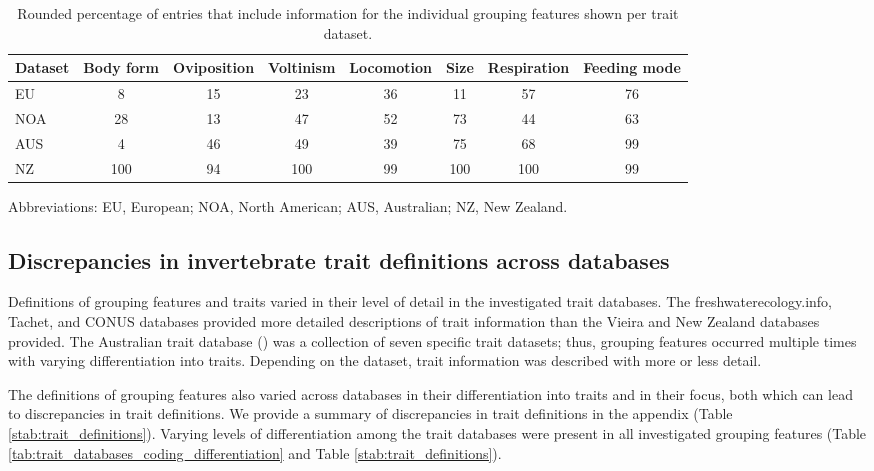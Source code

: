 \documentclass{article}
\begin{document}
\begin{table}[ht]
    \centering
    \caption{Rounded percentage of entries that include 
    information for the individual grouping features
    shown per trait dataset.} 
    \label{tab:trait_coverage}
    \begin{tabular}{lccccccc}
    \toprule[.1em]
    Dataset & Body form & Oviposition & Voltinism & Locomotion & Size & Respiration & Feeding mode \\ 
    \toprule[.1em]
    EU & 8 & 15 & 23 & 36 & 11 & 57 & 76 \\ 
    NOA & 28 & 13 & 47 & 52 & 73 & 44 & 63 \\ 
    AUS & 4 & 46 & 49 & 39 & 75 & 68 & 99 \\ 
    NZ & 100 & 94 & 100 & 99 & 100 & 100 & 99 \\ 
    \bottomrule
    \end{tabular}
\end{table}
\begin{minipage}{\linewidth}{\fontsize{8}{10}\selectfont
\centering
Abbreviations: EU, European; NOA, North American; AUS, Australian; NZ, New Zealand.
}
\end{minipage}

\newpage


\subsection*{Discrepancies in invertebrate trait definitions across databases}

Definitions of grouping features and traits varied in their level of detail in the investigated trait databases. The freshwaterecology.info, Tachet, and CONUS databases provided more detailed descriptions of trait information than the Vieira and New Zealand databases provided. The Australian trait database (\cite{kefford_integrated_2020}) was a collection of seven specific trait datasets; thus, grouping features occurred multiple times with varying differentiation into traits. Depending on the dataset, trait information was described with more or less detail.

The definitions of grouping features also varied across databases in their differentiation into traits and in their focus, both which can lead to discrepancies in trait definitions. We provide a summary of discrepancies in trait definitions in the appendix (Table \ref{stab:trait_definitions}). Varying levels of differentiation among the trait databases were present in all investigated grouping features (Table \ref{tab:trait_databases_coding_differentiation} and Table \ref{stab:trait_definitions}).
\end{document}
